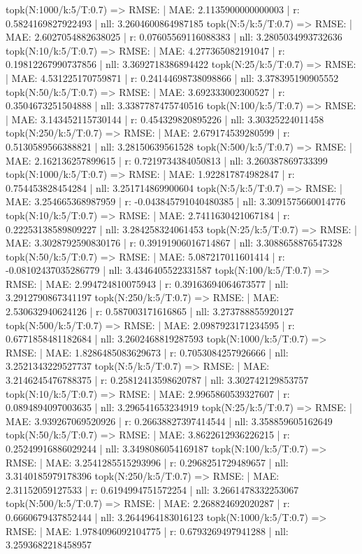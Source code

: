 topk(N:1000/k:5/T:0.7) => RMSE: | MAE: 2.1135900000000003 | r: 0.5824169827922493 | nll: 3.2604600864987185
topk(N:5/k:5/T:0.7) => RMSE: | MAE: 2.6027054882638025 | r: 0.07605569116088383 | nll: 3.2805034993732636
topk(N:10/k:5/T:0.7) => RMSE: | MAE: 4.277365082191047 | r: 0.19812267990737856 | nll: 3.3692718386894422
topk(N:25/k:5/T:0.7) => RMSE: | MAE: 4.531225170759871 | r: 0.24144698738098866 | nll: 3.378395190905552
topk(N:50/k:5/T:0.7) => RMSE: | MAE: 3.692333002300527 | r: 0.3504673251504888 | nll: 3.3387787475740516
topk(N:100/k:5/T:0.7) => RMSE: | MAE: 3.143452115730144 | r: 0.454329820895226 | nll: 3.30325224011458
topk(N:250/k:5/T:0.7) => RMSE: | MAE: 2.679174539280599 | r: 0.5130589566388821 | nll: 3.28150639561528
topk(N:500/k:5/T:0.7) => RMSE: | MAE: 2.162136257899615 | r: 0.7219734384050813 | nll: 3.260387869733399
topk(N:1000/k:5/T:0.7) => RMSE: | MAE: 1.922817874982847 | r: 0.754453828454284 | nll: 3.251714869900604
topk(N:5/k:5/T:0.7) => RMSE: | MAE: 3.254665368987959 | r: -0.043845791040480385 | nll: 3.3091575660014776
topk(N:10/k:5/T:0.7) => RMSE: | MAE: 2.7411630421067184 | r: 0.22253138589809227 | nll: 3.284258324061453
topk(N:25/k:5/T:0.7) => RMSE: | MAE: 3.3028792590830176 | r: 0.39191906016714867 | nll: 3.3088658876547328
topk(N:50/k:5/T:0.7) => RMSE: | MAE: 5.087217011601414 | r: -0.08102437035286779 | nll: 3.4346405522331587
topk(N:100/k:5/T:0.7) => RMSE: | MAE: 2.994724810075943 | r: 0.39163694064673577 | nll: 3.2912790867341197
topk(N:250/k:5/T:0.7) => RMSE: | MAE: 2.530632940624126 | r: 0.587003171616865 | nll: 3.273788855920127
topk(N:500/k:5/T:0.7) => RMSE: | MAE: 2.0987923171234595 | r: 0.6771858481182684 | nll: 3.2602468819287593
topk(N:1000/k:5/T:0.7) => RMSE: | MAE: 1.8286485083629673 | r: 0.7053084257926666 | nll: 3.2521343229527737
topk(N:5/k:5/T:0.7) => RMSE: | MAE: 3.2146245476788375 | r: 0.25812413598620787 | nll: 3.302742129853757
topk(N:10/k:5/T:0.7) => RMSE: | MAE: 2.9965860539327607 | r: 0.0894894097003635 | nll: 3.296541653234919
topk(N:25/k:5/T:0.7) => RMSE: | MAE: 3.939267069520926 | r: 0.26638827397414544 | nll: 3.358859605162649
topk(N:50/k:5/T:0.7) => RMSE: | MAE: 3.8622612936226215 | r: 0.25249916886029244 | nll: 3.3498086054169187
topk(N:100/k:5/T:0.7) => RMSE: | MAE: 3.2541285515293996 | r: 0.2968251729489657 | nll: 3.3140185979178396
topk(N:250/k:5/T:0.7) => RMSE: | MAE: 2.31152059127533 | r: 0.6194994751572254 | nll: 3.2661478332253067
topk(N:500/k:5/T:0.7) => RMSE: | MAE: 2.268824692020287 | r: 0.6660679437852444 | nll: 3.2644964183016123
topk(N:1000/k:5/T:0.7) => RMSE: | MAE: 1.9784096092104775 | r: 0.6793269497941288 | nll: 3.2593682218458957
